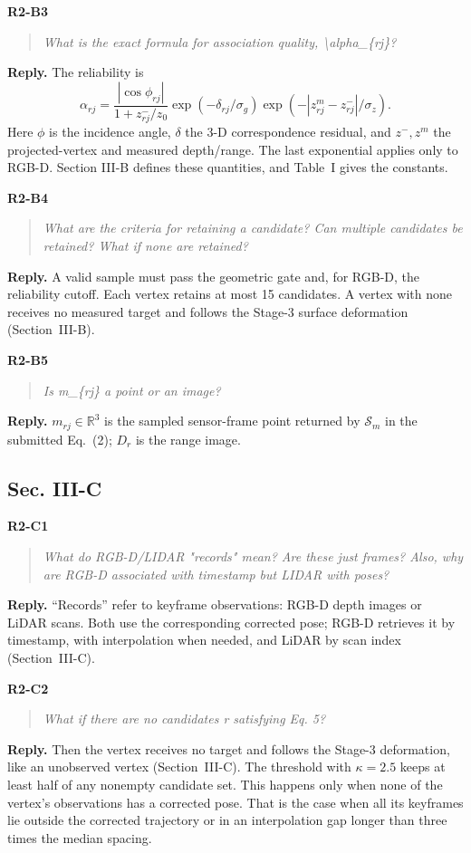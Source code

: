 \documentclass[11pt,a4paper]{article}
\newcommand{\point}[2]{\par\medskip\textbf{#1}\par\begin{quote}\itshape #2\end{quote}}
\newenvironment{reply}{\begingroup\color{replyblue}\textbf{Reply.} }{\par\endgroup}
\begin{document}
\point{R2-B3}{What is the exact formula for association quality, \textbackslash{}alpha\_\{rj\}?}
\begin{reply}
The reliability is
\[
\alpha_{rj}=\frac{|\cos\phi_{rj}|}{1+z^-_{rj}/z_0}
\exp(-\delta_{rj}/\sigma_g)\exp(-|z^m_{rj}-z^-_{rj}|/\sigma_z).
\]
Here $\phi$ is the incidence angle, $\delta$ the 3-D correspondence residual, and $z^-,z^m$ the projected-vertex and measured depth/range. The last exponential applies only to RGB-D. Section III-B defines these quantities, and Table~I gives the constants.
\end{reply}

\point{R2-B4}{What are the criteria for retaining a candidate? Can multiple candidates be retained? What if none are retained?}
\begin{reply}
A valid sample must pass the geometric gate and, for RGB-D, the reliability cutoff. Each vertex retains at most 15 candidates. A vertex with none receives no measured target and follows the Stage-3 surface deformation (Section~III-B).
\end{reply}

\point{R2-B5}{Is m\_\{rj\} a point or an image?}
\begin{reply}
$m_{rj}\in\mathbb R^3$ is the sampled sensor-frame point returned by $\mathcal S_m$ in the submitted Eq.~(2); $D_r$ is the range image.
\end{reply}

\subsection*{Sec. III-C}

\point{R2-C1}{What do RGB-D/LIDAR "records" mean? Are these just frames? Also, why are RGB-D associated with timestamp but LIDAR with poses?}
\begin{reply}
``Records'' refer to keyframe observations: RGB-D depth images or LiDAR scans. Both use the corresponding corrected pose; RGB-D retrieves it by timestamp, with interpolation when needed, and LiDAR by scan index (Section~III-C).
\end{reply}

\point{R2-C2}{What if there are no candidates r satisfying Eq. 5?}
\begin{reply}
Then the vertex receives no target and follows the Stage-3 deformation, like an unobserved vertex (Section~III-C). The threshold with $\kappa=2.5$ keeps at least half of any nonempty candidate set. This happens only when none of the vertex's observations has a corrected pose. That is the case when all its keyframes lie outside the corrected trajectory or in an interpolation gap longer than three times the median spacing.
\end{reply}
\end{document}
